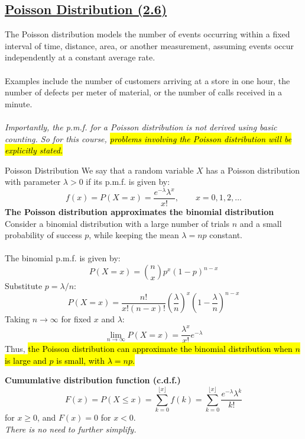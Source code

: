 ﻿\documentclass[12pt]{article}
\begin{document}
\subsection*{\underline{Poisson Distribution (2.6)}}
    The Poisson distribution models the number of events occurring within a fixed interval of time, distance, area, or another measurement, assuming events occur independently at a constant average rate.\\\\
Examples include the number of customers arriving at a store in one hour, the number of defects per meter of material, or the number of calls received in a minute.\\\\
\textit{Importantly, the p.m.f. for a Poisson distribution is not derived using basic counting. So for this course, \hl{problems involving the Poisson distribution will be explicitly stated.}}
\begin{definition}{Poisson Distribution}
We say that a random variable $X$ has a Poisson distribution with parameter $\lambda>0$ if its p.m.f. is given by:
\[
\boxed{f(x)=P(X=x)=\frac{e^{-\lambda}\lambda^x}{x!},\qquad x=0,1,2,\ldots}
\]
\textbf{The Poisson distribution approximates the binomial distribution}\\
Consider a binomial distribution with a large number of trials \(n\) and a small probability of success \(p\), while keeping the mean \(\lambda=np\) constant.\\\\
The binomial p.m.f. is given by:
\[
P(X=x)=\binom nx p^x(1-p)^{n-x}
\]
Substitute \(p=\lambda/n\):
\[
P(X=x)=\frac{n!}{x!(n-x)!}\left(\frac{\lambda}{n}\right)^x\left(1-\frac{\lambda}{n}\right)^{n-x}
\]
Taking \(n\to\infty\) for fixed \(x\) and \(\lambda\):
\[
\lim_{n\to\infty}P(X=x)=\frac{\lambda^x}{x!}e^{-\lambda}
\]
Thus, \hl{the Poisson distribution can approximate the binomial distribution when \mbox{$n$} is large and \mbox{$p$} is small, with \mbox{$\lambda=np$}.}
\end{definition}
\textbf{Cumumlative distribution function (c.d.f.)}\\
\[
F(x)=P(X\leq x)=\sum_{k=0}^{\lfloor x \rfloor}f(k) = \sum_{k=0}^{\lfloor x \rfloor}\frac{e^{-\lambda}\lambda^k}{k!}
\]
for \(x\geq0\), and \(F(x)=0\) for \(x<0\).\\
\textit{There is no need to further simplify.}\\\\
\end{document}
